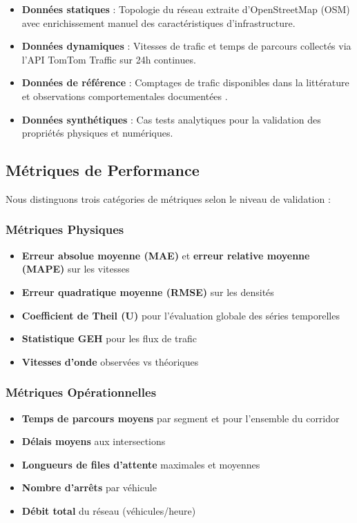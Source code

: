 \begin{itemize}
    \item \textbf{Données statiques} : Topologie du réseau extraite d'OpenStreetMap (OSM) avec enrichissement manuel des caractéristiques d'infrastructure.
    \item \textbf{Données dynamiques} : Vitesses de trafic et temps de parcours collectés via l'API TomTom Traffic sur 24h continues.
    \item \textbf{Données de référence} : Comptages de trafic disponibles dans la littérature \cite{ludi2020traffic} et observations comportementales documentées \cite{gomina2013urban}.
    \item \textbf{Données synthétiques} : Cas tests analytiques pour la validation des propriétés physiques et numériques.
\end{itemize}

\subsection{Métriques de Performance}
\label{subsec:metriques_performance}

Nous distinguons trois catégories de métriques selon le niveau de validation :

\subsubsection{Métriques Physiques}
\begin{itemize}
    \item \textbf{Erreur absolue moyenne (MAE)} et \textbf{erreur relative moyenne (MAPE)} sur les vitesses
    \item \textbf{Erreur quadratique moyenne (RMSE)} sur les densités
    \item \textbf{Coefficient de Theil (U)} pour l'évaluation globale des séries temporelles
    \item \textbf{Statistique GEH} pour les flux de trafic
    \item \textbf{Vitesses d'onde} observées vs théoriques
\end{itemize}

\subsubsection{Métriques Opérationnelles}
\begin{itemize}
    \item \textbf{Temps de parcours moyens} par segment et pour l'ensemble du corridor
    \item \textbf{Délais moyens} aux intersections
    \item \textbf{Longueurs de files d'attente} maximales et moyennes
    \item \textbf{Nombre d'arrêts} par véhicule
    \item \textbf{Débit total} du réseau (véhicules/heure)
\end{itemize}

